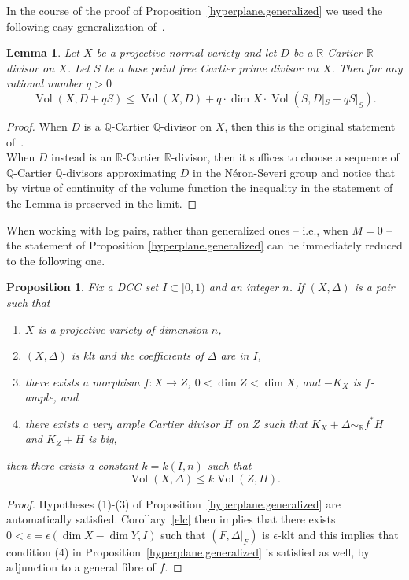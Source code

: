 \documentclass{amsart}[12pt,a4paper]
\newtheorem{lemma}[theorem]{Lemma}
\newtheorem{proposition}[theorem]{Proposition}
\theoremstyle{definition}
\DeclareMathOperator{\Vol}{\mathrm{Vol}}
\begin{document}
In the course of the proof of Proposition~\ref{hyperplane.generalized} we used the following easy generalization of~\cite[Lemma 2.5]{Jia15}.

\begin{lemma}\label{jiang}
Let $X$ be a projective normal variety and let $D$ be a  $\mathbb{R}$-Cartier $\mathbb{R}$-divisor on $X$. 
Let $S$ be a base point free Cartier prime divisor on $X$.
Then for any rational number $q>0$
\[
\Vol(X, D+qS) \leq 
\Vol(X, D) + q\cdot \dim X \cdot \Vol(S, D|_S+qS|_S).
\]
\end{lemma}

\begin{proof}
	When $D$ is a $\mathbb{Q}$-Cartier $\mathbb{Q}$-divisor on $X$, 
	then this is the original statement of~\cite[Lemma 2.5]{Jia15}. 
\\
	When $D$ instead is an $\mathbb{R}$-Cartier $\mathbb{R}$-divisor, 
	then it suffices to choose a sequence of $\mathbb{Q}$-Cartier 
	$\mathbb{Q}$-divisors approximating $D$ in the N\'eron-Severi 
	group and notice that by virtue of continuity of the volume 
	function the inequality in the statement of the Lemma is 
	preserved in the limit.
\end{proof}

When working with log pairs, rather than generalized ones -- i.e., when $M = 0$ -- the statement of Proposition \ref{hyperplane.generalized} can be immediately reduced to the following one.

\begin{proposition}
\label{hyperplane}
Fix a DCC set $I \subset [0, 1)$ and an integer $n$. 
If $(X, \Delta)$ is a pair such that
	\begin{enumerate}
		\item $X$ is a projective variety of dimension $n$,
		\item $(X, \Delta)$ is klt and the coefficients of $\Delta$ are in $I$,
		\item there exists a morphism $f\colon X \to Z$, $0< \dim Z< \dim X $, and $-K_X$ is $f$-ample, and
		\item there exists a very ample Cartier divisor $H$ on $Z$ such that $K_X+\Delta \sim_\mathbb{R} f^\ast H$ and $K_Z+H$ is big,
	\end{enumerate}		
then there exists a constant $k=k(I, n)$ such that
	\[
		\Vol(X, \Delta) \leq k \Vol(Z, H).
	\]
\end{proposition}

\begin{proof}
Hypotheses (1)-(3) of Proposition~\ref{hyperplane.generalized} are automatically satisfied.
Corollary~\ref{elc} then implies that there exists $0<\epsilon=\epsilon(\dim X -\dim Y, I)$ such that $(F, \Delta\vert_F)$ is $\epsilon$-klt and this implies that condition (4) in Proposition~\ref{hyperplane.generalized} is satisfied as well, by adjunction to a general fibre of $f$.
\end{proof}
\end{document}
